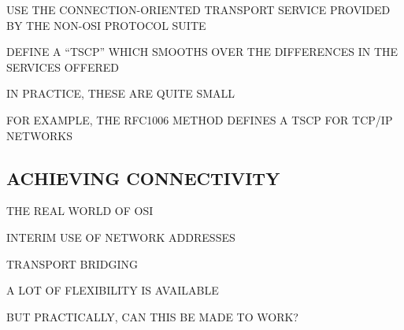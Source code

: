 

\begin{bwslide}

\begin{nrtc}
\item	USE THE CONNECTION-ORIENTED TRANSPORT SERVICE PROVIDED BY
	THE NON-OSI PROTOCOL SUITE

\item	DEFINE A ``TSCP'' WHICH SMOOTHS OVER THE DIFFERENCES IN THE SERVICES
	OFFERED
    \begin{nrtc}
    \item	IN PRACTICE, THESE ARE QUITE SMALL
    \end{nrtc}

\item	FOR EXAMPLE, THE RFC1006 METHOD DEFINES A TSCP FOR TCP/IP NETWORKS
\end{nrtc}
\end{bwslide}




\begin{bwslide}
\part	{ACHIEVING CONNECTIVITY}\bf

\begin{nrtc}
\item	THE REAL WORLD OF OSI

\item	INTERIM USE OF NETWORK ADDRESSES

\item	TRANSPORT BRIDGING
\end{nrtc}
\end{bwslide}


\begin{bwslide}

\begin{nrtc}
\item	A LOT OF FLEXIBILITY IS AVAILABLE

\item	BUT PRACTICALLY, CAN THIS BE MADE TO WORK?
\end{nrtc}
\end{bwslide}


